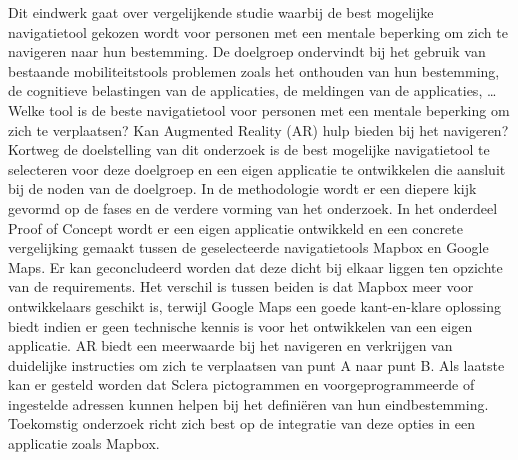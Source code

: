 Dit eindwerk gaat over vergelijkende studie waarbij de best mogelijke navigatietool gekozen wordt voor personen met een mentale beperking om zich te navigeren naar hun bestemming. De doelgroep ondervindt bij het gebruik van bestaande mobiliteitstools problemen zoals het onthouden van hun bestemming, de cognitieve belastingen van de applicaties, de meldingen van de applicaties, \ldots Welke tool is de beste navigatietool voor personen met een mentale beperking om zich te verplaatsen? Kan Augmented Reality (AR) hulp bieden bij het navigeren? Kortweg de doelstelling van dit onderzoek is de best mogelijke navigatietool te selecteren voor deze doelgroep en een eigen applicatie te ontwikkelen die aansluit bij de noden van de doelgroep. In de methodologie wordt er een diepere kijk gevormd op de fases en de verdere vorming van het onderzoek. In het onderdeel Proof of Concept wordt er een eigen applicatie ontwikkeld en een concrete vergelijking gemaakt tussen de geselecteerde navigatietools Mapbox en Google Maps. Er kan geconcludeerd worden dat deze dicht bij elkaar liggen ten opzichte van de requirements. Het verschil is tussen beiden is dat Mapbox meer voor ontwikkelaars geschikt is, terwijl Google Maps een goede kant-en-klare oplossing biedt indien er geen technische kennis is voor het ontwikkelen van een eigen applicatie. AR biedt een meerwaarde bij het navigeren en verkrijgen van duidelijke instructies om zich te verplaatsen van punt A naar punt B. Als laatste kan er gesteld worden dat Sclera pictogrammen en voorgeprogrammeerde of ingestelde adressen kunnen helpen bij het definiëren van hun eindbestemming. Toekomstig onderzoek richt zich best op de integratie van deze opties in een applicatie zoals Mapbox.
